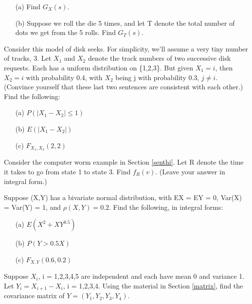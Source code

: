 \begin{itemize}

\item [(a)] Find $G_X(s)$.

\item [(b)] Suppose we roll the die 5 times, and let T denote the
total number of dots we get from the 5 rolls.  Find $G_T(s)$.

\end{itemize}

\oneproblem
Consider this model of disk seeks. For simplicity, we'll assume a very
tiny number of tracks, 3. Let $X_1$ and $X_2$ denote the track numbers
of two successive disk requests. Each has a uniform distribution on
\{1,2,3\}. But given $X_1 = i$, then $X_2 = i$ with probability 0.4, with
$X_2$ being j with probability 0.3, $j \neq i$. (Convince yourself that
these last two sentences are consistent with each other.) Find the
following:

\begin{itemize}

\item [(a)] $P(|X_1 - X_2| \leq 1)$

\item [(b)] $E(|X_1 - X_2|)$

\item [(c)] $F_{X_1,X_2}(2,2)$

\end{itemize}

\oneproblem
Consider the computer worm example in Section \ref{senthi}.  Let R
denote the time it takes to go from state 1 to state 3.  Find $f_R(v)$.  
(Leave your answer in integral form.)

\oneproblem
Suppose (X,Y) has a bivariate normal distribution, with EX = EY = 0,
Var(X) = Var(Y) = 1, and $\rho(X,Y) = 0.2$.  Find the following, in
integral forms:

\begin{itemize}

\item [(a)] $E(X^2+XY^{0.5})$

\item [(b)] $P(Y > 0.5X)$

\item [(c)] $F_{X,Y}(0.6,0.2)$

\end{itemize}
                      
\oneproblem
Suppose $X_i$, i = 1,2,3,4,5 are independent and each have mean 0 and   
variance 1.  Let $Y_i = X_{i+1} - X_i$, i = 1,2,3,4.  Using the 
material in Section \ref{matrix}, find the covariance matrix of 
$Y = (Y_1, Y_2, Y_3, Y_4)$.

